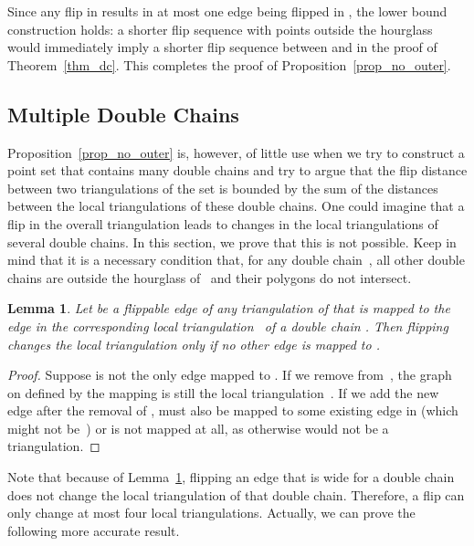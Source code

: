\documentclass[11pt,a4paper]{article}
\newcommand{\myqed}{\qed}
\renewcommand{\myqed}{}
\newtheorem{lemma}[theorem]{Lemma}
\begin{document}
Since any flip in  results in at most one edge being flipped in , the lower bound construction holds:
a shorter flip sequence with points outside the hourglass would immediately imply a shorter flip sequence between  and  in the proof of Theorem~\ref{thm_dc}.
This completes the proof of Proposition~\ref{prop_no_outer}.

\subsection{Multiple Double Chains}
Proposition~\ref{prop_no_outer} is, however, of little use when we try to construct a point set that contains many double chains and try to argue that the flip distance between two triangulations of the set is bounded by the sum of the distances between the local triangulations of these double chains.
One could imagine that a flip in the overall triangulation leads to changes in the local triangulations of several double chains.
In this section, we prove that this is not possible. Keep in mind that it is a necessary condition that, for any double chain~, all other double chains are outside the hourglass of~ and their polygons do not intersect.

\begin{lemma}\label{lem_mapping}
Let  be a flippable edge of any triangulation  of  that is mapped to the edge  in the corresponding local triangulation~ of a double chain .
Then flipping~ changes the local triangulation only if no other edge is mapped to .
\end{lemma}
\begin{proof}
Suppose  is not the only edge mapped to .
If we remove  from~, the graph on  defined by the mapping is still the local triangulation~.
If we add the new edge  after the removal of ,  must also be mapped to some existing edge  in  (which might not be~) or is not mapped at all, as otherwise  would not be a triangulation. 
\myqed
\end{proof}

Note that because of Lemma~\ref{lem_mapping}, flipping an edge that is wide for a double chain does not change the local triangulation of that double chain.
Therefore, a flip can only change at most four local triangulations.
Actually, we can prove the following more accurate result.
\end{document}
